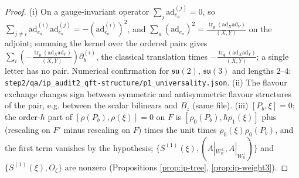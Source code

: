 \documentclass[11pt]{report}
\theoremstyle{plain}
\theoremstyle{definition}
\numberwithin{equation}{chapter}
\newcommand{\lam}{\tfrac{\operatorname{tr}_{\mathfrak g}(\mathrm{ad}_X\mathrm{ad}_Y)}{(X,Y)}}
\newcommand{\Wp}{W_{\mathbb R}^\perp}
\newcommand{\Ko}{(A|_{\Wp},A|_{\Wp})}
\begin{document}
\begin{proof}
(i) On a gauge-invariant operator $\sum_j\mathrm{ad}^{(j)}_{e_a}=0$, so $\sum_{j\neq i}\mathrm{ad}^{(i)}_{e_a}\mathrm{ad}^{(j)}_{e_a}=-(\mathrm{ad}^{(i)}_{e_a})^2$, and $\sum_a(\mathrm{ad}_{e_a})^2=\lam$ on the adjoint; summing the kernel over the ordered pairs gives $\sum_i(-\lam)\partial_b^{(i)}$, the classical translation times $-\lam$; a single letter has no pair. Numerical confirmation for $\mathfrak{su}(2)$, $\mathfrak{su}(3)$ and lengths $2$--$4$: \texttt{step2/qa/ip\_audit2\_qft-structure/p1\_universality.json}. (ii) The flavour exchange changes sign between symmetric and antisymmetric flavour structures of the pair, e.g. between the scalar bilinears and $B_z$ (same file). (iii) $[P_b,\xi]=0$; the order-$\hbar$ part of $[\rho(P_b),\rho(\xi)]=0$ on $F$ is $[\rho_0(P_b),\hbar\rho_1(\xi)]$ plus (rescaling on $F'$ minus rescaling on $F$) times the unit times $\rho_0(\xi)\rho_0(P_b)$, and the first term vanishes by the hypothesis; $\{S^{(1)}(\xi),\Ko\}$ and $\{S^{(1)}(\xi),O_\zeta\}$ are nonzero (Propositions \ref{prop:ip-tree}, \ref{prop:ip-weight3}).
\end{proof}
\end{document}
